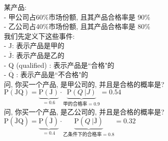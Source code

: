 \documentclass[UTF8]{ctexart}
\begin{document}
\begin{myEnvSample}
	某产品:  \\
	- 甲公司占60\%市场份额, 且其产品合格率是 90\% \\
	- 乙公司占40\%市场份额, 且其产品合格率是 80\% \\
	
	我们先定义下这些事件: \\
	- J: 表示产品是甲的 \\
	- $\overline{\text{J}}$: 表示产品是乙的 \\
	- Q (qualified) : 表示产品是``合格"的 \\
	- $\overline{\text{Q}}$ : 表示产品是``不合格"的 \\
	
    问, 你买一个产品, 是甲公司的, 并且是合格的概率是? \\
    $
    \text{P}\left( \text{JQ} \right) =\underset{=0.6}{\underbrace{\text{P}\left( \text{J} \right) }}\cdot \underset{\text{甲的合格率}=0.9}{\underbrace{\text{P}\left( Q \ | J \right) }}=0.54
    $ \\
    
    问, 你买一个产品, 是乙公司的, 并且是合格的概率是? \\
    $
    \text{P}\left( \overline{\text{J}}\text{Q} \right) =\underset{=0.4}{\underbrace{\text{P}\left( \overline{\text{J}} \right) }}\cdot \underset{\text{乙条件下的合格率}=0.8}{\underbrace{\text{P}\left(Q \ | \overline{\text{J}} \right) }}=0.32
    $      
\end{myEnvSample}
\vspace{1em} 
\end{document}
